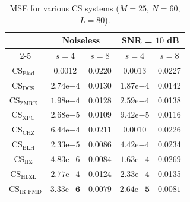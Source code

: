 \begin{table}
\caption{MSE for various CS systems ($M=25$, $N=60$, $L=80$).}
\label{table_mse}
\centering
\begin{tabular}{|c|c|c|c|c|}
\hline
& \multicolumn{2}{c|}{Noiseless} & \multicolumn{2}{c|}{SNR = $10$ dB}\\ 
\cline{2-5}
& $s=4$ & $s=8$ & $s=4$ & $s=8$\\ 
\hline
$\text{CS}_{\text{Elad}}$~\cite{Elad} & 0.0012 & 0.0220 & 0.0013 & 0.0227\\ 
\hline
$\text{CS}_{\text{DCS}}$~\cite{Sapiro} & $2.74\mathrm{e}{-4}$ & 0.0130 & $1.87\mathrm{e}{-4}$ & 0.0142\\ 
\hline
$\text{CS}_{\text{ZMRE}}$~\cite{Zelnik} & $1.98\mathrm{e}{-4}$ & 0.0128 & $2.59\mathrm{e}{-4}$ & 0.0138\\ 
\hline
$\text{CS}_{\text{XPC}}$~\cite{Xuprojection} & $2.68\mathrm{e}{-5}$ & 0.0109 & $9.42\mathrm{e}{-5}$ & 0.0116\\ 
\hline
$\text{CS}_{\text{CHZ}}$~\cite{CHZ} & $6.44\mathrm{e}{-4}$ & 0.0211 & 0.0010 & 0.0226\\ 
\hline
$\text{CS}_{\text{BLH}}$~\cite{SRE_Huang} & $2.33\mathrm{e}{-5}$ & 0.0086 & $4.42\mathrm{e}{-4}$ & 0.0234\\ 
\hline
$\text{CS}_{\text{HZ}}$~\cite{HONG_robust} & $4.83\mathrm{e}{-6}$ & 0.0084 & $1.63\mathrm{e}{-4}$ & 0.0269\\ 
\hline
$\text{CS}_{\text{HLZL}}$~\cite{HONG_robust} & $2.77\mathrm{e}{-4}$ & 0.0124 & $2.33\mathrm{e}{-4}$ & 0.0135\\ 
\hline
$\text{CS}_{\text{IR-PMD}}$ & $\mathbf{3.33\mathrm{e}{-6}}$ & $\mathbf{0.0079}$ & $\mathbf{2.64\mathrm{e}{-5}}$ & $\mathbf{0.0081}$\\ 
\hline
\end{tabular}
\end{table}

